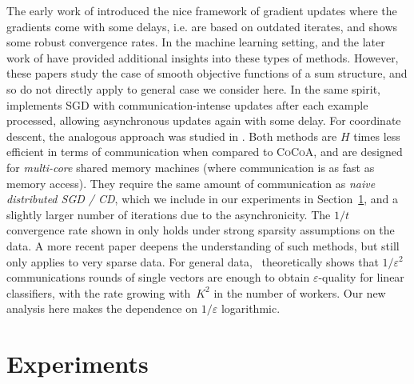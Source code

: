 \documentclass{article} %
\newcommand{\algname}{\textsc{CoCoA}\xspace}  %
\begin{document}
The early work of \cite{Tsitsiklis:1986ee} introduced the nice framework of
gradient updates where the gradients come with some delays, i.e. are based on
outdated iterates, and shows some robust convergence rates.
In the machine learning setting, \cite{Dekel:2012wm} and the later work of
\cite{Agarwal:2011vo} have provided additional insights into these types of methods.
However, these papers study the case of smooth objective functions of a sum
structure, and so do not directly apply to general case we consider here.
In the same spirit,~\cite{Niu:2011wo} %
implements SGD with communication-intense updates after each example
processed, allowing asynchronous updates again with some delay.
For coordinate descent, the analogous approach was studied in \cite{Liu:2014wj}. %
Both methods \cite{Niu:2011wo,Liu:2014wj} are $H$ times less efficient in terms
of communication when compared to \algname, and are designed for \emph{multi-core} 
shared memory machines (where communication is as fast as memory access). 
They require the same amount of communication as \emph{naive distributed SGD / CD}, 
which we include in our experiments in Section~\ref{experiments}, and a 
slightly larger number of iterations due to the asynchronicity.
The $1/t$ convergence rate shown in 
\cite{Niu:2011wo} only holds under strong sparsity assumptions on the data.
A more recent paper \cite{Duchi:2013te} deepens the understanding of such 
methods, but still only applies to very sparse data.
For general data,~\cite{Balcan:2012tc} theoretically shows that
$1/\varepsilon^2$ communications rounds of single vectors are enough to
obtain $\varepsilon$-quality for linear classifiers, with the rate 
growing with~$K^2$ in the number of workers. Our new analysis here makes the
dependence on $1/\varepsilon$ logarithmic.
\vspace{-3mm}





%
\section{Experiments} \label{experiments}
\end{document}
